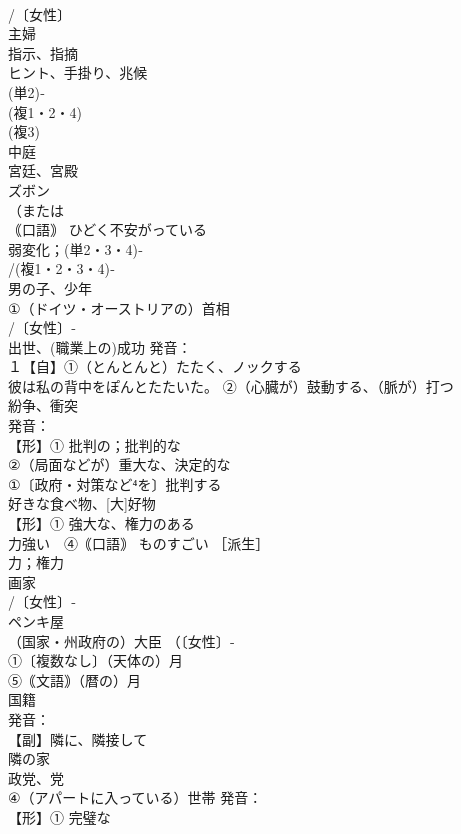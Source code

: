 \documentclass[8pt]{extreport}
\begin{document}
\begin{CJK}{UTF8}{min}
\\	/〔女性〕
\\	主婦 
\\	指示、指摘　
\\	ヒント、手掛り、兆候
\\	(単2)‐
\\	(複1・2・4)
\\	(複3)
\\	中庭 
\\	宮廷、宮殿
\\	ズボン 
\\	（または
\\	｟口語｠ ひどく不安がっている
\\	弱変化；(単2・3・4)‐
\\	/(複1・2・3・4)‐
\\	男の子、少年 
\\	①（ドイツ・オーストリアの）首相
\\	/〔女性〕‐
\\	出世、(職業上の)成功 発音：
\\	１【自】①（とんとんと）たたく、ノックする 
\\	彼は私の背中をぽんとたたいた。 ②（心臓が）鼓動する、（脈が）打つ
\\	紛争、衝突 
\\	発音：
\\	【形】① 批判の；批判的な 
\\	②（局面などが）重大な、決定的な
\\	①〔政府・対策など⁴を〕批判する 
\\	好きな食べ物、[大]好物 
\\	【形】① 強大な、権力のある 
\\	力強い　④｟口語｠ ものすごい ［派生］ 
\\	力；権力 
\\	画家 
\\	/〔女性〕‐
\\	ペンキ屋
\\	（国家・州政府の）大臣 （〔女性〕‐
\\	①〔複数なし〕（天体の）月 
\\	⑤｟文語｠（暦の）月 
\\	国籍 
\\	発音：
\\	【副】隣に、隣接して 
\\	隣の家
\\	政党、党 
\\	④（アパートに入っている）世帯 発音：
\\	【形】① 完璧な 

\end{CJK}
\end{document}
